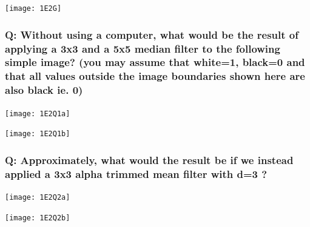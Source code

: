 \documentclass{article}
\begin{document}
	\begin{center}
		\texttt{[image: 1E2G]}
	\end{center}
	
	\subsubsection*{Q: Without using a computer, what would be the result of applying a 3x3 and a 5x5 median filter to the following simple image? (you may assume that white=1, black=0 and that all values outside the image boundaries shown here are also black ie. 0) }
	
	\begin{center}	
		\texttt{[image: 1E2Q1a]}
	\end{center}
	\newpage
	\noindent \texttt{[image: 1E2Q1b]}
	
	\newpage
	\subsubsection*{Q: Approximately, what would the result be if we instead applied a 3x3 alpha trimmed mean filter with d=3 ? }
	\noindent \texttt{[image: 1E2Q2a]}
	
	\newpage
	\noindent \texttt{[image: 1E2Q2b]}
\end{document}
